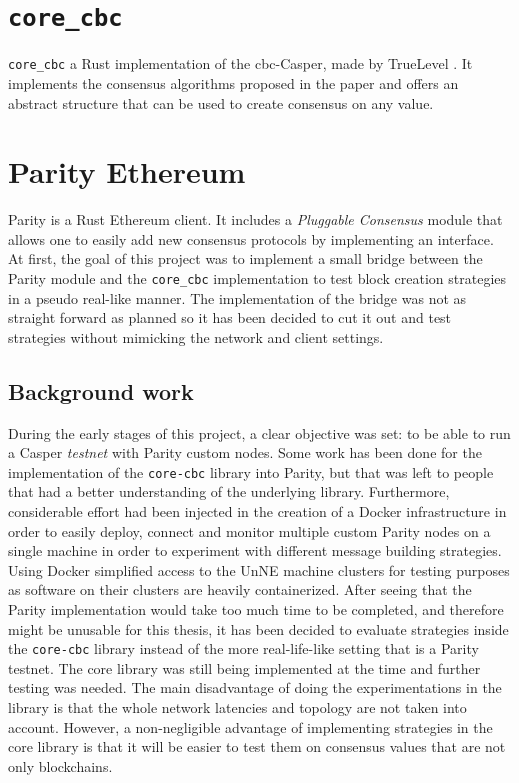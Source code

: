 \section{\texttt{core\_cbc}}
\texttt{core\_cbc} a Rust implementation of the \gls{cbc}-Casper, made by
TrueLevel . It implements the consensus algorithms
proposed in the paper and offers an abstract structure that can be used to
create consensus on any value.

\section{Parity Ethereum}
Parity is a Rust Ethereum client. It includes a \textit{Pluggable Consensus}
module that allows one to easily add new consensus protocols by implementing an
interface.  At first, the goal of this project was to implement a small bridge
between the Parity module and the \texttt{core\_cbc} implementation to test block creation
strategies in a pseudo real-like manner. The implementation of the bridge was
not as straight forward as planned so it has been decided to cut it out and test
strategies without mimicking the network and client settings.

\subsection{Background work}
During the early stages of this project, a clear objective was set: to be able
to run a Casper \textit{testnet} with Parity custom nodes. Some work has been
done for the implementation of the \texttt{core-cbc} library into Parity, but
that was left to people that had a better understanding of the underlying
library. Furthermore, considerable effort had been injected in the creation of a
Docker infrastructure in order to easily deploy, connect and monitor multiple
custom Parity nodes on a single machine in order to experiment with different
message building strategies. Using Docker simplified access to the UnNE machine
clusters for testing purposes as software on their clusters are heavily
containerized. After seeing that the Parity implementation would take too much
time to be completed, and therefore might be unusable for this thesis, it has
been decided to evaluate strategies inside the \texttt{core-cbc} library instead
of the more real-life-like setting that is a Parity testnet. The core library
was still being implemented at the time and further testing was needed.  The
main disadvantage of doing the experimentations in the library is that the whole
network latencies and topology are not taken into account. However, a
non-negligible advantage of implementing strategies in the core library is that
it will be easier to test them on consensus values that are not only
blockchains.

